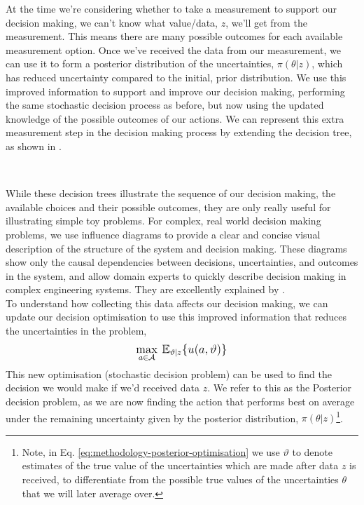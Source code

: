 At the time we're considering whether to take a measurement to support our decision making, we can't know what value/data, $z$, we'll get from the measurement. This means there are many possible outcomes for each available measurement option. Once we've received the data from our measurement, we can use it to form a posterior distribution of the uncertainties, $\pi(\theta|z)$, which has reduced uncertainty compared to the initial, prior distribution. We use this improved information to support and improve our decision making, performing the same stochastic decision process as before, but now using the updated knowledge of the possible outcomes of our actions. We can represent this extra measurement step in the decision making process by extending the decision tree, as shown in .

\

While these decision trees illustrate the sequence of our decision making, the available choices and their possible outcomes, they are only really useful for illustrating simple toy problems. For complex, real world decision making problems, we use influence diagrams to provide a clear and concise visual description of the structure of the system and decision making. These diagrams show only the causal dependencies between decisions, uncertainties, and outcomes in the system, and allow domain experts to quickly describe decision making in complex engineering systems. They are excellently explained by \citep{difrancesco2023GuidanceUseProbabilistic}.\\

To understand how collecting this data affects our decision making, we can update our decision optimisation to use this improved information that reduces the uncertainties in the problem,
\begin{equation} \label{eq:methodology-posterior-optimisation}
    \mathlarger{\max_{a \in \mathcal{A}} \: \mathbb{E}_{\vartheta|z}\lbrace u(a,\vartheta) \rbrace}
\end{equation}
This new optimisation (stochastic decision problem) can be used to find the decision we would make if we'd received data $z$. We refer to this as the Posterior decision problem, as we are now finding the action that performs best on average under the remaining uncertainty given by the posterior distribution, $\pi(\theta|z)$\footnote{Note, in Eq. \ref{eq:methodology-posterior-optimisation} we use $\vartheta$ to denote estimates of the true value of the uncertainties which are made after data $z$ is received, to differentiate from the possible true values of the uncertainties $\theta$ that we will later average over.}.\\

